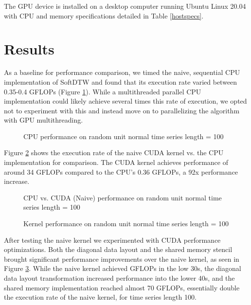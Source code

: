 \documentclass[12pt, letterpaper]{article}
\begin{document}
The GPU device is installed on a desktop computer running Ubuntu Linux 20.04
with CPU and memory specifications detailed in Table \ref{hostspecs}.

\section{Results}
\FloatBarrier

As a baseline for performance comparison, we timed the naive, sequential CPU
implementation of SoftDTW and found that its execution rate varied between
0.35-0.4 GFLOPs (Figure \ref{plot_cpu}). While a multithreaded parallel CPU
implementation could likely achieve several times this rate of execution, we
opted not to experiment with this and instead move on to parallelizing the
algorithm with GPU multithreading.

\begin{figure}[htbp]
    \begin{center}
        \scalebox{0.85}{}
    \end{center}
    \caption{CPU performance on random unit normal time series length = 100}
    \label{plot_cpu}
\end{figure}

Figure \ref{plot_cpu_gpu} shows the execution rate of the naive CUDA kernel
vs. the CPU implementation for comparison. The CUDA kernel achieves performance
of around 34 GFLOPs compared to the CPU's 0.36 GFLOPs, a 92x performance
increase.

\begin{figure}[htbp]
    \begin{center}
        \scalebox{0.85}{}
    \end{center}
    \caption{CPU vs. CUDA (Naive) performance on random unit normal time series
      length = 100}
    \label{plot_cpu_gpu}
\end{figure}


\begin{figure}[htbp]
    \begin{center}
        \scalebox{0.85}{}
    \end{center}
    \caption{Kernel performance on random unit normal time series length =
      100}
    \label{plot_multi}
\end{figure}

After testing the naive kernel we experimented with CUDA performance
optimizations. Both the diagonal data layout and the shared memory stencil
brought significant performance improvements over the naive kernel, as seen in
Figure \ref{plot_multi}. While the naive kernel achieved GFLOPs in the low 30s,
the diagonal data layout transformation increased performance into the lower
40s, and the shared memory implementation reached almost 70 GFLOPs, essentially
double the execution rate of the naive kernel, for time series length 100.
\end{document}
